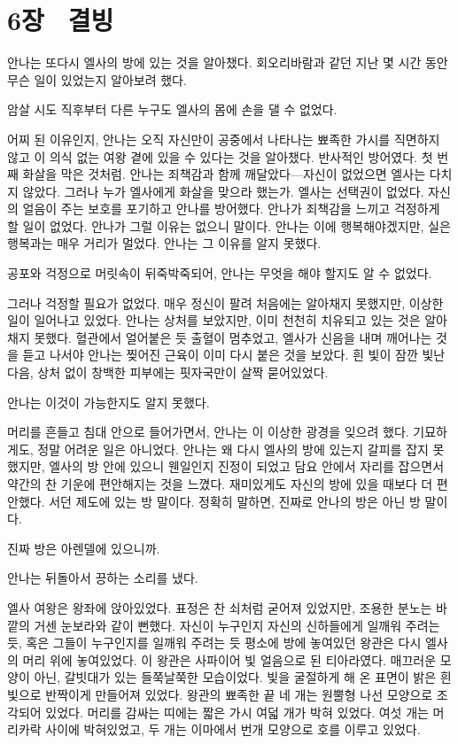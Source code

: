 

\chapter[6장  결빙][{6장\hspace*{.5em}결빙}]{6장 \ 결빙}



안나는 또다시 엘사의 방에 있는 것을 알아챘다. 회오리바람과 같던 지난 몇 시간 동안 무슨 일이 있었는지 알아보려 했다.

암살 시도 직후부터 다른 누구도 엘사의 몸에 손을 댈 수 없었다.

어찌 된 이유인지, 안나는 오직 자신만이 공중에서 나타나는 뾰족한 가시를 직면하지 않고 이 의식 없는 여왕 곁에 있을 수 있다는 것을 알아챘다. 반사적인 방어였다. 첫 번째 화살을 막은 것처럼. 안나는 죄책감과 함께 깨달았다—자신이 없었으면 엘사는 다치지 않았다. 그러나 누가 엘사에게 화살을 맞으라 했는가. 엘사는 선택권이 없었다. 자신의 얼음이 주는 보호를 포기하고 안나를 방어했다. 안나가 죄책감을 느끼고 걱정하게 할 일이 없었다. 안나가 그럴 이유는 없으니 말이다. 안나는 이에 행복해야겠지만, 실은 행복과는 매우 거리가 멀었다. 안나는 그 이유를 알지 못했다.

공포와 걱정으로 머릿속이 뒤죽박죽되어, 안나는 무엇을 해야 할지도 알 수 없었다.

그러나 걱정할 필요가 없었다. 매우 정신이 팔려 처음에는 알아채지 못했지만, 이상한 일이 일어나고 있었다. 안나는 상처를 보았지만, 이미 천천히 치유되고 있는 것은 알아채지 못했다. 혈관에서 얼어붙은 듯 출혈이 멈추었고, 엘사가 신음을 내며 깨어나는 것을 듣고 나서야 안나는 찢어진 근육이 이미 다시 붙은 것을 보았다. 흰 빛이 잠깐 빛난 다음, 상처 없이 창백한 피부에는 핏자국만이 살짝 묻어있었다.

안나는 이것이 가능한지도 알지 못했다.

머리를 흔들고 침대 안으로 들어가면서, 안나는 이 이상한 광경을 잊으려 했다. 기묘하게도, 정말 어려운 일은 아니었다. 안나는 왜 다시 엘사의 방에 있는지 갈피를 잡지 못했지만, 엘사의 방 안에 있으니 웬일인지 진정이 되었고 담요 안에서 자리를 잡으면서 약간의 찬 기운에 편안해지는 것을 느꼈다. 재미있게도 자신의 방에 있을 때보다 더 편안했다. 서던 제도에 있는 방 말이다. 정확히 말하면, 진짜로 안나의 방은 아닌 방 말이다.

진짜 방은 아렌델에 있으니까.

안나는 뒤돌아서 끙하는 소리를 냈다.

\textbreak

엘사 여왕은 왕좌에 앉아있었다. 표정은 찬 쇠처럼 굳어져 있었지만, 조용한 분노는 바깥의 거센 눈보라와 같이 뻔했다. 자신이 누구인지 자신의 신하들에게 일깨워 주려는 듯, 혹은 그들이 누구인지를 일깨워 주려는 듯 평소에 방에 놓여있던 왕관은 다시 엘사의 머리 위에 놓여있었다. 이 왕관은 사파이어 빛 얼음으로 된 티아라였다. 매끄러운 모양이 아닌, 갈빗대가 있는 들쭉날쭉한 모습이었다. 빛을 굴절하게 해 온 표면이 밝은 흰 빛으로 반짝이게 만들어져 있었다. 왕관의 뾰족한 끝 네 개는 원뿔형 나선 모양으로 조각되어 있었다. 머리를 감싸는 띠에는 짧은 가시 여덟 개가 박혀 있었다. 여섯 개는 머리카락 사이에 박혀있었고, 두 개는 이마에서 번개 모양으로 호를 이루고 있었다.

